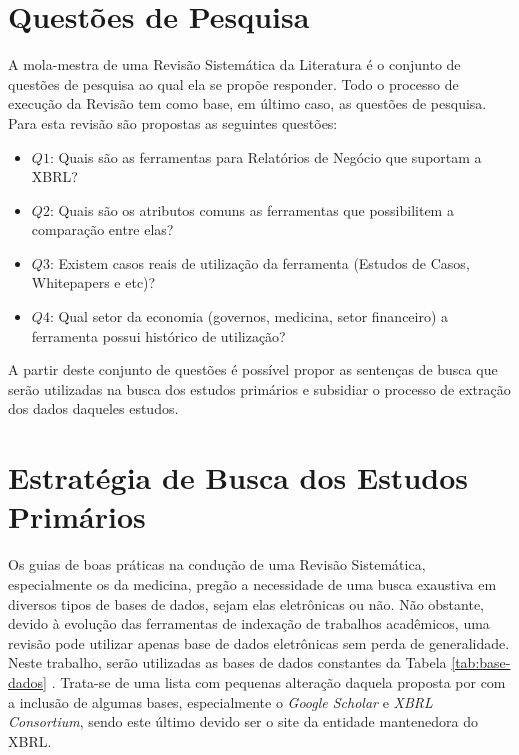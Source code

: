 \documentclass{article}
\begin{document}
\section{Questões de Pesquisa}
\label{sec:questoes_pesquisa}

A mola-mestra de uma Revisão Sistemática da Literatura é o conjunto de questões de pesquisa ao qual ela se propõe responder. Todo o processo de execução da Revisão tem como base, em último caso, as questões de pesquisa. Para esta revisão são propostas as seguintes questões:

\begin{itemize}
  \item \textbf{$Q1$}: Quais são as ferramentas para Relatórios de Negócio que
    suportam a XBRL?
  \item \textbf{$Q2$}: Quais são os atributos comuns as ferramentas
    que possibilitem a comparação entre elas?
  \item \textbf{$Q3$}: Existem casos reais de utilização da ferramenta
    (Estudos de Casos, Whitepapers e etc)?
  \item \textbf{$Q4$}: Qual setor da economia (governos, medicina, setor financeiro) a ferramenta possui histórico de utilização?
\end{itemize}
A partir deste conjunto de questões é possível propor as sentenças de busca que serão utilizadas na busca dos estudos primários e subsidiar o processo de extração dos dados daqueles estudos.

\section{Estratégia de Busca dos Estudos Primários}
\label{sec:busca_estudos}

Os guias de boas práticas na condução de uma Revisão Sistemática, especialmente
os da medicina, pregão a necessidade de uma busca exaustiva em diversos tipos
de bases de dados, sejam elas eletrônicas ou não. Não obstante, devido à
evolução das ferramentas de indexação de trabalhos acadêmicos, uma revisão pode
utilizar apenas base de dados eletrônicas sem perda de generalidade. Neste
trabalho, serão utilizadas as bases de dados constantes da Tabela
\ref{tab:base-dados} . Trata-se de uma lista com pequenas alteração daquela
proposta por \cite{Brereton2007571} com a inclusão de algumas bases,
especialmente o \textit{Google Scholar} e  \textit{XBRL Consortium}, sendo este
último devido ser o site da entidade mantenedora do XBRL.
\end{document}

